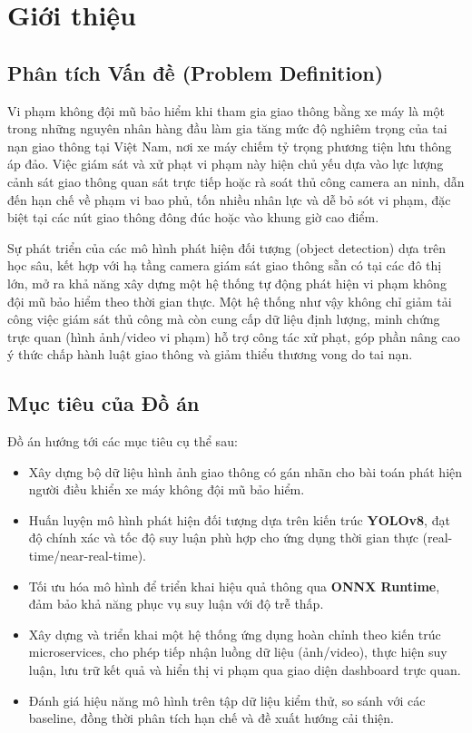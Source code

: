 \section{Giới thiệu}
\label{sec:introduction}

\subsection{Phân tích Vấn đề (Problem Definition)}
Vi phạm không đội mũ bảo hiểm khi tham gia giao thông bằng xe máy là một trong những nguyên nhân hàng đầu làm gia tăng mức độ nghiêm trọng của tai nạn giao thông tại Việt Nam, nơi xe máy chiếm tỷ trọng phương tiện lưu thông áp đảo. Việc giám sát và xử phạt vi phạm này hiện chủ yếu dựa vào lực lượng cảnh sát giao thông quan sát trực tiếp hoặc rà soát thủ công camera an ninh, dẫn đến hạn chế về phạm vi bao phủ, tốn nhiều nhân lực và dễ bỏ sót vi phạm, đặc biệt tại các nút giao thông đông đúc hoặc vào khung giờ cao điểm.

Sự phát triển của các mô hình phát hiện đối tượng (object detection) dựa trên học sâu, kết hợp với hạ tầng camera giám sát giao thông sẵn có tại các đô thị lớn, mở ra khả năng xây dựng một hệ thống tự động phát hiện vi phạm không đội mũ bảo hiểm theo thời gian thực. Một hệ thống như vậy không chỉ giảm tải công việc giám sát thủ công mà còn cung cấp dữ liệu định lượng, minh chứng trực quan (hình ảnh/video vi phạm) hỗ trợ công tác xử phạt, góp phần nâng cao ý thức chấp hành luật giao thông và giảm thiểu thương vong do tai nạn.

\subsection{Mục tiêu của Đồ án}
Đồ án hướng tới các mục tiêu cụ thể sau:
\begin{itemize}
    \item Xây dựng bộ dữ liệu hình ảnh giao thông có gán nhãn cho bài toán phát hiện người điều khiển xe máy không đội mũ bảo hiểm.
    \item Huấn luyện mô hình phát hiện đối tượng dựa trên kiến trúc \textbf{YOLOv8}, đạt độ chính xác và tốc độ suy luận phù hợp cho ứng dụng thời gian thực (real-time/near-real-time).
    \item Tối ưu hóa mô hình để triển khai hiệu quả thông qua \textbf{ONNX Runtime}, đảm bảo khả năng phục vụ suy luận với độ trễ thấp.
    \item Xây dựng và triển khai một hệ thống ứng dụng hoàn chỉnh theo kiến trúc microservices, cho phép tiếp nhận luồng dữ liệu (ảnh/video), thực hiện suy luận, lưu trữ kết quả và hiển thị vi phạm qua giao diện dashboard trực quan.
    \item Đánh giá hiệu năng mô hình trên tập dữ liệu kiểm thử, so sánh với các baseline, đồng thời phân tích hạn chế và đề xuất hướng cải thiện.
\end{itemize}

